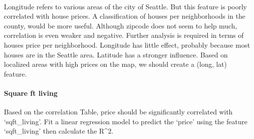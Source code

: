 \documentclass[11pt]{article}
\begin{document}
    \begin{center}
    \end{center}
    { \hspace*{\fill} \\}
    
    Longitude refers to various areas of the city of Seattle. But this
feature is poorly correlated with house prices. A classification of
houses per neighborhoods in the county, would be more useful. Although
zipcode does not seem to help much, correlation is even weaker and
negative. Further analysis is required in terms of houses price per
neighborhood. { Longitude has little effect, probably because most
houses are in the Seattle area. Latitude has a stronger influence. Based
on localized areas with high prices on the map, we should create a
(long, lat) feature. }

    \hypertarget{square-ft-living}{%
\paragraph{Square ft living}\label{square-ft-living}}

Based on the correlation Table, price should be significantly correlated
with `sqft\_living'. Fit a linear regression model to predict the
`price' using the feature `sqft\_living' then calculate the R\^{}2.
\end{document}
